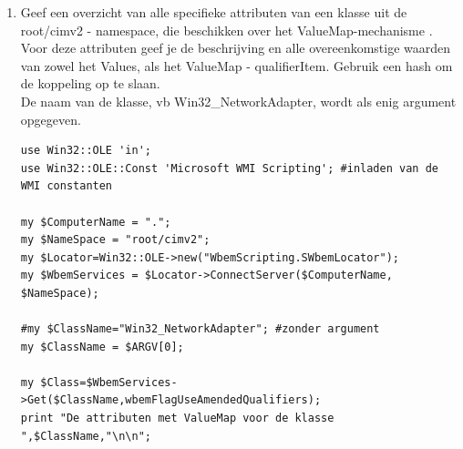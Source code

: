 \documentclass[11pt,a4paper]{report}
\begin{document}
\begin{enumerate}[resume]
\begin{lstlisting}
foreach my $Class ( in $Classes) {
	next unless isSetTrue($Class,"Association");  #enkel Associatorklassen
	next if     isSetTrue($Class,"Abstract");     #geen abstracte klassen
	my @Keys = ();
	my @Types= ();
	foreach my $Property (in $Class->{Properties_}) {
		#zoek de 2 unieke sleutelattributen
		if (isSetTrue($Property,"Key")){
			#onthoud de naam van het sleutelattribuut
			push @Keys ,$Property->{Name};
			#de CIMTYPE-attribuutqualifier bevat de naam van de klasse die kan gekoppeld worden met dit sleutelattribuut
			push @Types,substr($Property->{Qualifiers_}->Item("CIMType")->{Value},4); #verwijder ref:
			last if @Keys==2;
		}
	}
	printf ("%-21s via %-28s(%s)\n", $Types[0], $Class->{Path_}->{RelPath}, (join ",",@Keys)) 
	if (@Types==2 && $Types[0] eq $Types[1]);
}
	\end{lstlisting}
	\item Geef een overzicht van alle specifieke attributen van een klasse uit de root/cimv2 - namespace, die beschikken over het ValueMap-mechanisme . Voor deze attributen geef je de beschrijving en alle overeenkomstige waarden van zowel het Values, als het ValueMap - qualifierItem. Gebruik een hash om de koppeling op te slaan.
	\\De naam van de klasse, vb Win32\_NetworkAdapter, wordt als enig argument opgegeven.
	\begin{lstlisting}
use Win32::OLE 'in';
use Win32::OLE::Const 'Microsoft WMI Scripting'; #inladen van de WMI constanten

my $ComputerName = ".";
my $NameSpace = "root/cimv2";
my $Locator=Win32::OLE->new("WbemScripting.SWbemLocator");
my $WbemServices = $Locator->ConnectServer($ComputerName, $NameSpace);

#my $ClassName="Win32_NetworkAdapter"; #zonder argument
my $ClassName = $ARGV[0]; 

my $Class=$WbemServices->Get($ClassName,wbemFlagUseAmendedQualifiers);
print "De attributen met ValueMap voor de klasse ",$ClassName,"\n\n";


\end{lstlisting}
\end{enumerate}
\end{document}
